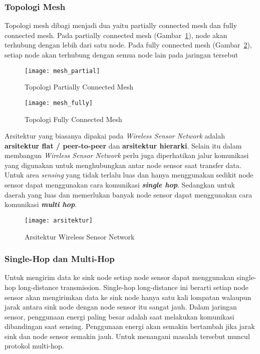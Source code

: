 \subsubsection{Topologi Mesh}
Topologi mesh dibagi menjadi dua yaitu partially connected mesh dan fully connected mesh. Pada partially connected mesh (Gambar~\ref{fig:mesh_partial}), node akan terhubung dengan lebih dari satu node. Pada fully connected mesh (Gambar~\ref{fig:mesh_fully}), setiap node akan terhubung dengan semua node lain pada jaringan tersebut
\begin{figure} [H]
	\centering  
	\texttt{[image: mesh\_partial]}  
	\caption[Topologi Partially Connected Mesh]{Topologi Partially Connected Mesh} 
	\label{fig:mesh_partial} 
\end{figure} 
\begin{figure} [H]
	\centering  
	\texttt{[image: mesh\_fully]}  
	\caption[Topologi Fully Connected Mesh]{Topologi Fully Connected Mesh} 
	\label{fig:mesh_fully} 
\end{figure} 

Arsitektur yang biasanya dipakai pada \textit{Wireless Sensor Network} adalah \textbf{arsitektur flat / peer-to-peer} dan \textbf{arsitektur hierarki}. Selain itu dalam membangun \textit{Wireless Sensor Network} perlu juga diperhatikan jalur komunikasi yang digunakan untuk menghubungkan antar node sensor saat transfer data. Untuk area \textit{sensing} yang tidak terlalu luas dan hanya menggunakan sedikit node sensor dapat menggunakan cara komunikasi \textbf{\textit{single hop}}. Sedangkan untuk daerah yang luas dan memerlukan banyak node sensor dapat menggunakan cara komunikasi \textbf{\textit{multi hop}}. 

\begin{figure} [H]
	\centering  
	\texttt{[image: arsitektur]}  
	\caption[Arsitektur Wireless Sensor Network]{Arsitektur Wireless Sensor Network} 
	\label{fig:arsitektur} 
\end{figure} 

\subsubsection{Single-Hop dan Multi-Hop}
Untuk mengirim data ke sink node setiap node sensor dapat menggunakan single-hop long-distance transmission. Single-hop long-distance ini berarti setiap node sensor akan mengirimkan data ke sink node hanya satu kali lompatan walaupun jarak antara sink node dengan node sensor itu sangat jauh. Dalam jaringan sensor, penggunaan energi paling besar adalah saat melakukan komunikasi dibandingan saat sensing. Penggunaan energi akan semakin bertambah jika jarak sink dan node sensor semakin jauh. Untuk menangani masalah tersebut muncul protokol multi-hop.

